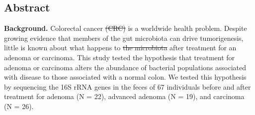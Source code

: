 \documentclass[12pt,]{article}
\providecommand{\DIFaddtex}[1]{{\protect\color{blue}\uwave{#1}}} %
\providecommand{\DIFdeltex}[1]{{\protect\color{red}\sout{#1}}}                      %
\providecommand{\DIFaddbegin}{} %
\providecommand{\DIFaddend}{} %
\providecommand{\DIFdelbegin}{} %
\providecommand{\DIFdelend}{} %
\providecommand{\DIFadd}[1]{\texorpdfstring{\DIFaddtex{#1}}{#1}} %
\providecommand{\DIFdel}[1]{\texorpdfstring{\DIFdeltex{#1}}{}} %
\begin{document}
\linenumbers

\subsection{Abstract}\label{abstract}

\textbf{Background.} Colorectal cancer \DIFdelbegin \DIFdel{(CRC) }\DIFdelend is a worldwide health problem.
Despite growing evidence that members of the gut microbiota can drive
tumorigenesis, little is known about what happens to \DIFdelbegin \DIFdel{the
microbiota }\DIFdelend \DIFaddbegin \DIFadd{it }\DIFaddend after treatment
for an adenoma or carcinoma. This study tested the hypothesis that
treatment for adenoma or carcinoma alters the abundance of bacterial
populations associated with disease to those associated with a normal
colon. We tested this hypothesis by sequencing the 16S rRNA genes in the
feces of 67 individuals before and after treatment for adenoma (N = 22),
advanced adenoma (N = 19), and carcinoma (N = 26).
\end{document}
